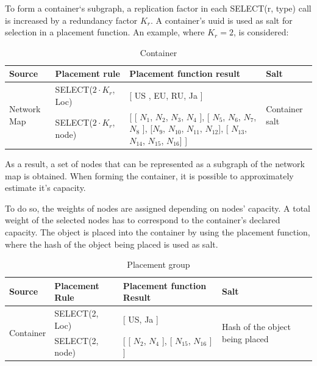 \documentclass[a4paper, 11pt]{article}
\begin{document}
To form a container`s subgraph, a replication factor in each SELECT(r, type)
call is increased by a redundancy factor $ K_r $. A container's uuid is
used as salt for selection in a placement function. An example, where $K_r=2$, is considered:

\begin{table}[!h]
\begin{scriptsize}
\begin{tabular}{@{}|l|l|l|l|@{}}
\toprule
Source & Placement rule & Placement function result & Salt              \\ \midrule
\multirow{2}{*}{Network Map} & SELECT($2 \cdot K_r$, Loc) & [ US , EU, RU, Ja ] & \multirow{2}{*}{Container salt} \\ \cmidrule(r){2-3}
 & SELECT($2 \cdot K_r$, node) & \parbox{6cm}{ [ [ $N_1$, $N_2$, $N_3$, $N_4$ ], [ $N_5$, $N_6$, $N_7$, $N_8$ ], [$N_9$, $N_{10}$, $N_{11}$, $N_{12}$], [ $N_{13}$, $N_{14}$, $N_{15}$, $N_{16}$] ] } &  \\ \bottomrule
\end{tabular}
\end{scriptsize}
\caption{Container}
\end{table}

As a result, a set of nodes that can be represented as a subgraph
of the network map is obtained. When forming the container, it is possible to
approximately estimate it's capacity. 

To do so, the weights of nodes are assigned depending on nodes' capacity. 
A total weight of the selected nodes has to correspond to the container's 
declared capacity. The object is placed into the container by using the 
placement function, where the hash of the object being placed is used as salt.

\begin{table}[!h]
\begin{scriptsize}
\begin{tabular}{@{}|l|l|l|l|@{}}
\toprule
Source & Placement Rule & Placement function Result & Salt              \\ \midrule
\multirow{2}{*}{Container} & SELECT(2, Loc) & [ US, Ja ] & \multirow{2}{*}{Hash of the object being placed} \\ \cmidrule(r){2-3}
 & SELECT(2, node) & [ [ $N_2$, $N_4$ ], [ $N_{15}$, $N_{16}$ ] ] &  \\ \bottomrule
\end{tabular}
\end{scriptsize}
\caption{Placement group}
\end{table}
\end{document}
